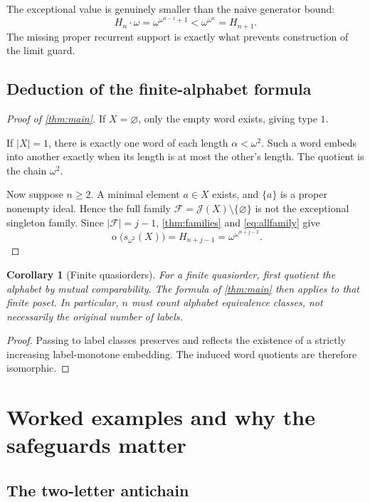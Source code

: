 \documentclass[11pt]{article}
\numberwithin{equation}{section}
\theoremstyle{plain}
\newtheorem{corollary}[corollary]{Corollary}
\theoremstyle{definition}
\theoremstyle{remark}
\newcommand{\ot}{\operatorname{o}}
\newcommand{\J}{\mathcal J}
\newcommand{\F}{\mathcal F}
\newcommand{\HH}{H}
\begin{document}
The exceptional value is genuinely smaller than the naive generator bound:
\[
 \HH_n\cdot\omega
 =\omega^{\omega^{n-1}+1}
 <\omega^{\omega^n}=\HH_{n+1}.
\]
The missing proper recurrent support is exactly what prevents construction of the limit guard.

\subsection{Deduction of the finite-alphabet formula}

\begin{proof}[Proof of \cref{thm:main}]
If $X=\varnothing$, only the empty word exists, giving type $1$.

If $|X|=1$, there is exactly one word of each length $\alpha<\omega^2$. Such a word embeds into another exactly when its length is at most the other's length. The quotient is the chain $\omega^2$.

Now suppose $n\geq2$. A minimal element $a\in X$ exists, and $\{a\}$ is a proper nonempty ideal. Hence the full family $\F=\J(X)\setminus\{\varnothing\}$ is not the exceptional singleton family. Since $|\F|=j-1$, \cref{thm:families} and \eqref{eq:allfamily} give
\[
 \ot\bigl(s_{\omega^2}(X)\bigr)
  =\HH_{n+j-1}
  =\omega^{\omega^{n+j-2}}.
\]
\end{proof}

\begin{corollary}[Finite quasiorders]
For a finite quasiorder, first quotient the alphabet by mutual comparability. The formula of \cref{thm:main} then applies to that finite poset. In particular, $n$ must count alphabet equivalence classes, not necessarily the original number of labels.
\end{corollary}
\begin{proof}
Passing to label classes preserves and reflects the existence of a strictly increasing label-monotone embedding. The induced word quotients are therefore isomorphic.
\end{proof}

\section{Worked examples and why the safeguards matter}\label{sec:examples}

\subsection{The two-letter antichain}
\end{document}
